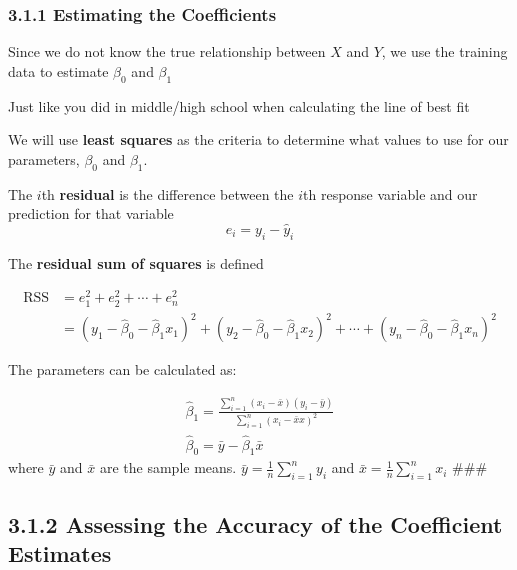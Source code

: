         \subsubsection*{3.1.1  Estimating the Coefficients}\label{estimating-the-coefficients}
        
        Since we do not know the true relationship between \(X\) and \(Y\), we use the training data to estimate \(\beta_0\) and \(\beta_1\)

        \begin{note}
            Just like you did in middle/high school when calculating the line of best fit
        \end{note}
        
        We will use \textbf{least squares} as the criteria to determine what values to use for our parameters, \(\beta_0\) and \(\beta_1\).
        
        The \(i\)th \textbf{residual} is the difference between the \(i\)th response variable and our prediction for that variable
        \begin{equation*}
        e_i = y_i - \hat y_i
        \end{equation*}
        
        The \textbf{residual sum of squares} is defined
        
        
        \begin{align*}
            \text{RSS} &= e_1^2 + e_2^2 + \cdots + e_n^2 \\
            &= (y_1 - \hat \beta_0 - \hat \beta_1 x_1)^2 + (y_2 - \hat \beta_0 - \hat \beta_1 x_2)^2  + \cdots + (y_n - \hat \beta_0 - \hat \beta_1 x_n)^2 
        \end{align*}
        
        
        The parameters can be calculated as:
        
        \begin{gather*}
        \hat \beta_1 = \frac{\sum_{i=1}^n(x_i - \bar x)(y_i-\bar y)}{\sum_{i=1}^n(x_i - \bar xx)^2}\\
        \hat \beta_0 = \bar y - \hat \beta_1 \bar x
    \end{gather*}
     where \(\bar y\) and \(\bar x\) are the sample means.
        \(\bar y = \frac{1}{n}\sum_{i=1}^n y_i\) and
        \(\bar x = \frac{1}{n}\sum_{i=1}^n x_i\) \#\#\# 
        \subsection*{3.1.2 Assessing the Accuracy of the Coefficient Estimates}
